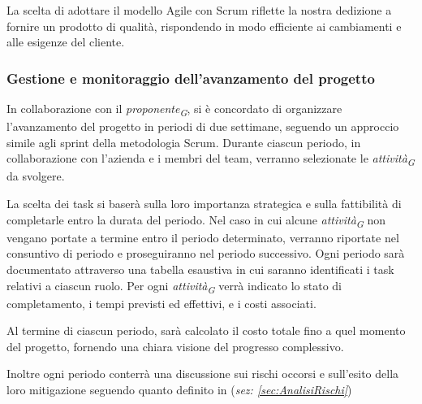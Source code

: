 La scelta di adottare il modello Agile con Scrum riflette la nostra dedizione a fornire un prodotto di qualità, rispondendo in modo efficiente ai cambiamenti e alle esigenze del cliente.

\pagebreak

\subsubsection{Gestione e monitoraggio dell'avanzamento del progetto}
In collaborazione con il \textit{proponente}\textsubscript{\textit{G}}, si è concordato di organizzare l'avanzamento del progetto in periodi di due settimane, seguendo un approccio simile agli sprint della metodologia Scrum. Durante ciascun periodo, in collaborazione con l'azienda e i membri del team, verranno selezionate le \textit{attività}\textsubscript{\textit{G}} da svolgere.

\vspace{0.2cm}

La scelta dei task si baserà sulla loro importanza strategica e sulla fattibilità di completarle entro la durata del periodo. Nel caso in cui alcune \textit{attività}\textsubscript{\textit{G}} non vengano portate a termine entro il periodo determinato, verranno riportate nel consuntivo di periodo e proseguiranno nel periodo successivo.
Ogni periodo sarà documentato attraverso una tabella esaustiva in cui saranno identificati i task relativi a ciascun ruolo. Per ogni \textit{attività}\textsubscript{\textit{G}} verrà indicato lo stato di completamento, i tempi previsti ed effettivi, e i costi associati.

\vspace{0.2cm}



Al termine di ciascun periodo, sarà calcolato il costo totale fino a quel momento del progetto, fornendo una chiara visione del progresso complessivo.

Inoltre ogni periodo conterrà una discussione sui rischi occorsi e sull'esito della loro mitigazione seguendo quanto definito in (\textit{sez: \ref{sec:AnalisiRischi}})

